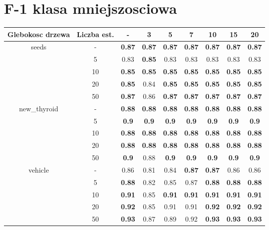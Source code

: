 \documentclass{article}%
\begin{document}
\section*{F{-}1 klasa mniejszosciowa}%
\begin{tabular}{c|c|ccccccc}%
\hline%
Glebokosc drzewa&Liczba est.&{-}&3&5&7&10&15&20\\%
\hline%
\multirow{5}{*}{seeds}&{-}&\textbf{0.87}&\textbf{0.87}&\textbf{0.87}&\textbf{0.87}&\textbf{0.87}&\textbf{0.87}&\textbf{0.87}\\%
\cline{2%
-%
9}%
&5&0.83&\textbf{0.85}&0.83&0.83&0.83&0.83&0.83\\%
\cline{2%
-%
9}%
&10&\textbf{0.85}&\textbf{0.85}&\textbf{0.85}&\textbf{0.85}&\textbf{0.85}&\textbf{0.85}&\textbf{0.85}\\%
\cline{2%
-%
9}%
&20&\textbf{0.85}&0.84&\textbf{0.85}&\textbf{0.85}&\textbf{0.85}&\textbf{0.85}&\textbf{0.85}\\%
\cline{2%
-%
9}%
&50&\textbf{0.87}&0.86&\textbf{0.87}&\textbf{0.87}&\textbf{0.87}&\textbf{0.87}&\textbf{0.87}\\%
\hline%
\multirow{5}{*}{new\_thyroid}&{-}&\textbf{0.88}&\textbf{0.88}&\textbf{0.88}&\textbf{0.88}&\textbf{0.88}&\textbf{0.88}&\textbf{0.88}\\%
\cline{2%
-%
9}%
&5&\textbf{0.9}&\textbf{0.9}&\textbf{0.9}&\textbf{0.9}&\textbf{0.9}&\textbf{0.9}&\textbf{0.9}\\%
\cline{2%
-%
9}%
&10&\textbf{0.88}&\textbf{0.88}&\textbf{0.88}&\textbf{0.88}&\textbf{0.88}&\textbf{0.88}&\textbf{0.88}\\%
\cline{2%
-%
9}%
&20&\textbf{0.88}&\textbf{0.88}&\textbf{0.88}&\textbf{0.88}&\textbf{0.88}&\textbf{0.88}&\textbf{0.88}\\%
\cline{2%
-%
9}%
&50&\textbf{0.9}&0.88&\textbf{0.9}&\textbf{0.9}&\textbf{0.9}&\textbf{0.9}&\textbf{0.9}\\%
\hline%
\multirow{5}{*}{vehicle}&{-}&0.86&0.81&0.84&\textbf{0.87}&\textbf{0.87}&0.86&0.86\\%
\cline{2%
-%
9}%
&5&\textbf{0.88}&0.82&0.85&0.87&\textbf{0.88}&\textbf{0.88}&\textbf{0.88}\\%
\cline{2%
-%
9}%
&10&\textbf{0.91}&0.85&\textbf{0.91}&\textbf{0.91}&\textbf{0.91}&\textbf{0.91}&\textbf{0.91}\\%
\cline{2%
-%
9}%
&20&\textbf{0.92}&0.85&0.91&0.91&\textbf{0.92}&\textbf{0.92}&\textbf{0.92}\\%
\cline{2%
-%
9}%
&50&\textbf{0.93}&0.87&0.89&0.92&\textbf{0.93}&\textbf{0.93}&\textbf{0.93}\\%

\end{tabular}
\end{document}
